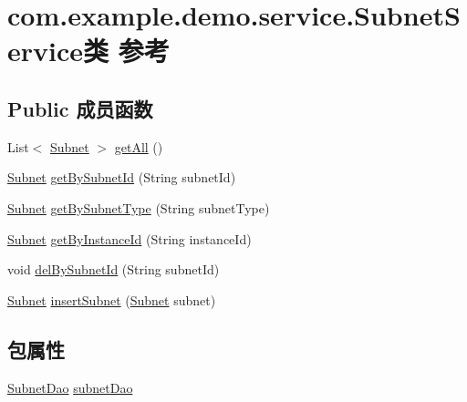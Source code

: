\hypertarget{classcom_1_1example_1_1demo_1_1service_1_1_subnet_service}{}\section{com.\+example.\+demo.\+service.\+Subnet\+Service类 参考}
\label{classcom_1_1example_1_1demo_1_1service_1_1_subnet_service}
\subsection*{Public 成员函数}
\begin{DoxyCompactItemize}
\item 
List$<$ \mbox{\hyperlink{classcom_1_1example_1_1demo_1_1modular_1_1_subnet}{Subnet}} $>$ \mbox{\hyperlink{classcom_1_1example_1_1demo_1_1service_1_1_subnet_service_a269181dbb488b4897c1bd687e31d095a}{get\+All}} ()
\item 
\mbox{\hyperlink{classcom_1_1example_1_1demo_1_1modular_1_1_subnet}{Subnet}} \mbox{\hyperlink{classcom_1_1example_1_1demo_1_1service_1_1_subnet_service_a74378dd66dff283b66bff375e65d5d27}{get\+By\+Subnet\+Id}} (String subnet\+Id)
\item 
\mbox{\hyperlink{classcom_1_1example_1_1demo_1_1modular_1_1_subnet}{Subnet}} \mbox{\hyperlink{classcom_1_1example_1_1demo_1_1service_1_1_subnet_service_ac4dd42bb56acf8f4ec1bdcff60475c70}{get\+By\+Subnet\+Type}} (String subnet\+Type)
\item 
\mbox{\hyperlink{classcom_1_1example_1_1demo_1_1modular_1_1_subnet}{Subnet}} \mbox{\hyperlink{classcom_1_1example_1_1demo_1_1service_1_1_subnet_service_a4795f484c4aaa3c9b599b9661d9f0f9e}{get\+By\+Instance\+Id}} (String instance\+Id)
\item 
void \mbox{\hyperlink{classcom_1_1example_1_1demo_1_1service_1_1_subnet_service_a7517a0528364ca251f501e4b147fe6be}{del\+By\+Subnet\+Id}} (String subnet\+Id)
\item 
\mbox{\hyperlink{classcom_1_1example_1_1demo_1_1modular_1_1_subnet}{Subnet}} \mbox{\hyperlink{classcom_1_1example_1_1demo_1_1service_1_1_subnet_service_ade6d115da07c94bfb824fc4b5c854e9d}{insert\+Subnet}} (\mbox{\hyperlink{classcom_1_1example_1_1demo_1_1modular_1_1_subnet}{Subnet}} subnet)
\end{DoxyCompactItemize}
\subsection*{包属性}
\begin{DoxyCompactItemize}
\item 
\mbox{\hyperlink{interfacecom_1_1example_1_1demo_1_1dao_1_1_subnet_dao}{Subnet\+Dao}} \mbox{\hyperlink{classcom_1_1example_1_1demo_1_1service_1_1_subnet_service_a07dc0665e632fd20af8cfa5460c7447e}{subnet\+Dao}}
\end{DoxyCompactItemize}


